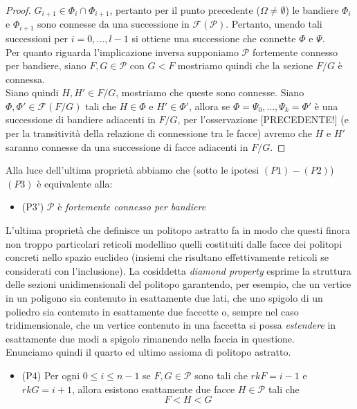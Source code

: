 \documentclass[a4paper,12pt]{report}
\newcommand{\p}{\mathcal{P}}
\theoremstyle{plain}
\theoremstyle{definition}
\begin{document}
\begin{proof}
$G_{i+1}\in\Phi_i\cap\Phi_{i+1}$, pertanto per il punto precedente ($\Omega\neq\emptyset$) le bandiere $\Phi_i$ e $\Phi_{i+1}$ sono connesse da una successione
in $\mathcal{F}(\p)$. Pertanto, unendo tali successioni per $i=0,\dots,l-1$ si ottiene una successione che connette $\Phi$ e $\Psi$.\\
Per quanto riguarda l'implicazione inversa supponiamo $\p$ fortemente connesso per bandiere, siano $F,G\in\p$ con $G<F$ mostriamo quindi che la sezione $F/G$
\`e connessa.\\
Siano quindi $H,H'\in F/G$, mostriamo che queste sono connesse. Siano $\Phi,\Phi'\in\mathcal{F}(F/G)$ tali che $H\in\Phi$ e $H'\in\Phi'$, allora 
se $\Phi=\Psi_0,\dots,\Psi_k=\Phi'$ \`e una successione di bandiere adiacenti in $F/G$, per l'osservazione [PRECEDENTE!] (e per la transitivit\`a
della relazione di connessione tra le facce) avremo che $H$ e $H'$ saranno connesse da una successione di facce adiacenti in $F/G$.
\end{proof}
Alla luce dell'ultima propriet\`a abbiamo che (sotto le ipotesi $(P1)-(P2)$) $(P3)$ \`e equivalente alla:
\begin{itemize}
\item (P3') $\p$ \`e \emph{fortemente connesso per bandiere}
\end{itemize}
L'ultima propriet\`a che definisce un politopo astratto fa in modo che questi finora non troppo particolari reticoli modellino quelli costituiti
dalle facce dei politopi concreti nello spazio euclideo (insiemi che risultano effettivamente reticoli se considerati con l'inclusione).
La cosiddetta \emph{diamond property} esprime la struttura delle sezioni unidimensionali del politopo garantendo, per esempio, che un vertice in un
poligono sia contenuto in esattamente due lati, che uno spigolo di un poliedro sia contenuto in esattamente due faccette o, sempre nel caso tridimensionale,
che un vertice contenuto in una faccetta si possa \emph{estendere} in esattamente due modi a spigolo rimanendo nella faccia in questione.\\
Enunciamo quindi il quarto ed ultimo assioma di politopo astratto.
\begin{itemize}
\item (P4) Per ogni $0\leq i\leq n-1$ se $F,G\in\p$ sono tali che $rkF=i-1$ e $rkG=i+1$, allora esistono esattamente due facce $H\in\p$ tali che
\begin{equation*}
F<H<G
\end{equation*}
\end{itemize}
\end{document}

